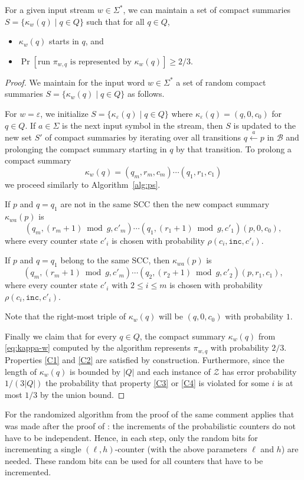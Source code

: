 \documentclass{article}\usepackage[a4paper,margin=20mm]{geometry}
\newcommand{\B}{\mathcal{B}}
\newcommand{\BZ}{\mathcal{Z}}
\newcommand{\eps}{\varepsilon}
\renewcommand{\geq}{\geqslant}
\renewcommand{\leq}{\leqslant}
\renewcommand{\le}{\leq}
\begin{document}
\begin{proposition}
\label{prop:ps-alg}
For a given input stream $w \in \Sigma^*$, we can maintain a set of compact summaries $S = \{\kappa_w(q) \mid q \in Q \}$
such that for all $q \in Q$,
\begin{itemize}
    \item $\kappa_w(q)$ starts in $q$, and 
    \item $\Pr[\text{run $\pi_{w,q}$ is represented by $\kappa_w(q)$}] \geq 2/3$.
\end{itemize}
\end{proposition}

\begin{proof}
We maintain for the input word $w \in \Sigma^*$ a set of
random compact summaries $S = \{\kappa_w(q) \mid q \in Q \}$ as follows.

For $w = \eps$, we initialize $S = \{\kappa_{\eps}(q) \mid q \in Q\}$
where $\kappa_{\eps}(q) = (q,0,c_0)$ for $q \in Q$.
If $a \in \Sigma$ is the next input symbol in the stream, then $S$ is updated to the new set $S'$ of compact summaries
by iterating over all transitions $q \xleftarrow{a} p$ in $\B$ and prolonging the compact summary starting in $q$
by that transition.
To prolong a compact summary 
\begin{equation} \label{eq:kappa-w}
\kappa_{w}(q) = (q_m, r_m, c_m) \cdots (q_1, r_1, c_1) 
\end{equation}
we proceed similarly to Algorithm~\ref{alg:ps}.


If $p$ and $q = q_1$ are not in the same SCC then the new compact summary $\kappa_{wa}(p)$ is
\[
	 (q_m,(r_m+1) \bmod g, c'_m) \cdots (q_1,(r_1+1) \bmod g, c'_1) (p, 0, c_0),
\]
where every counter state $c'_i$ is chosen with probability $\rho(c_i,\mathtt{inc}, c'_i)$.

If $p$ and $q = q_1$ belong to the same SCC, then $\kappa_{wa}(p)$ is
\[
	(q_m,(r_m+1) \bmod g, c'_m) \cdots (q_2,(r_2+1) \bmod g, c'_2) (p,r_1, c_1),
\]
where every counter state $c'_i$ with $2 \le i \le m$ is chosen with probability $\rho(c_i,\mathtt{inc}, c'_i)$.

Note that the right-most triple of $\kappa_{w}(q)$ will be $(q,0,c_0)$ with probability $1$.

Finally we claim that for every $q \in Q$, the compact summary $\kappa_w(q)$ from \eqref{eq:kappa-w} computed by the algorithm
represents $\pi_{w,q}$ with probability $2/3$. 
Properties \ref{C1} and \ref{C2} are satisfied by construction.
Furthermore, since the length of $\kappa_w(q)$ is bounded by $|Q|$
and each instance of $\BZ$ has error probability $1/(3|Q|)$
the probability that property \ref{C3} or \ref{C4} is violated for some $i$
is at most $1/3$ by the union bound.
\end{proof}
For the randomized algorithm from the proof of  the same comment applies that was made after the proof of : 
the increments of the probabilistic counters do not have to be independent. 
Hence, in each step, only the random bits for incrementing a single $(\ell, h)$-counter (with the above parameters $\ell$ and $h$)
are needed. These random bits can be used for all counters that have to be incremented. 
\end{document}
